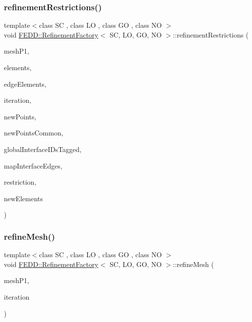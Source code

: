 \subsubsection{\texorpdfstring{refinement\+Restrictions()}{refinementRestrictions()}}
{\footnotesize\ttfamily template$<$class SC , class LO , class GO , class NO $>$ \\
void \hyperlink{classFEDD_1_1RefinementFactory}{F\+E\+D\+D\+::\+Refinement\+Factory}$<$ SC, LO, GO, NO $>$\+::refinement\+Restrictions (\begin{DoxyParamCaption}\item[{\hyperlink{classFEDD_1_1RefinementFactory_aea0fab96821387bc772333299102b2c9}{Mesh\+Unstr\+Ref\+Ptr\+\_\+\+Type}}]{mesh\+P1,  }\item[{\hyperlink{classFEDD_1_1RefinementFactory_a0994b5b7b6d080048673941251999f2e}{Elements\+Ptr\+\_\+\+Type}}]{elements,  }\item[{\hyperlink{classFEDD_1_1RefinementFactory_ae5285e990ec4632d6188a1280627ad13}{Edge\+Elements\+Ptr\+\_\+\+Type}}]{edge\+Elements,  }\item[{int}]{iteration,  }\item[{int \&}]{new\+Points,  }\item[{int \&}]{new\+Points\+Common,  }\item[{vec\+\_\+\+G\+O\+\_\+\+Type \&}]{global\+Interface\+I\+Ds\+Tagged,  }\item[{\hyperlink{classFEDD_1_1RefinementFactory_a8256ccdf1b2a5c977ddc011f4e8eb8d3}{Map\+Const\+Ptr\+\_\+\+Type}}]{map\+Interface\+Edges,  }\item[{string}]{restriction,  }\item[{int \&}]{new\+Elements }\end{DoxyParamCaption})}

\mbox{\label{classFEDD_1_1RefinementFactory_aec49fcc71406ba48eb7d6766653914d5}} 
\subsubsection{\texorpdfstring{refine\+Mesh()}{refineMesh()}}
{\footnotesize\ttfamily template$<$class SC , class LO , class GO , class NO $>$ \\
void \hyperlink{classFEDD_1_1RefinementFactory}{F\+E\+D\+D\+::\+Refinement\+Factory}$<$ SC, LO, GO, NO $>$\+::refine\+Mesh (\begin{DoxyParamCaption}\item[{\hyperlink{classFEDD_1_1RefinementFactory_af6e25bbcc6f5e8d6ee70a1c5aab1e3eb}{Mesh\+Unstr\+Ref\+Ptr\+Array\+\_\+\+Type}}]{mesh\+P1,  }\item[{int}]{iteration }\end{DoxyParamCaption})}

